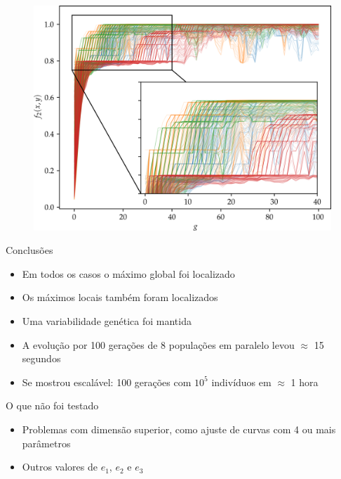 \begin{frame}
  \begin{figure}
    \centering
    \includegraphics[height=0.95\textheight]{imagens/high_prob/evolution_near_gaussians.png}
  \end{figure}
\end{frame}

\begin{frame}
  \begin{block}{Conclusões}
    \begin{itemize}
      \item Em todos os casos o máximo global foi localizado
      \item Os máximos locais também foram localizados
      \item Uma variabilidade genética foi mantida
      \item A evolução por 100 gerações de 8 populações em paralelo
            levou $\approx$ 15 segundos
      \item Se mostrou escalável: 100 gerações com $10^5$ indivíduos
            em $\approx$ 1 hora
    \end{itemize}
  \end{block}
  \begin{alertblock}{O que não foi testado}
    \begin{itemize}
      \item Problemas com dimensão superior, como ajuste de curvas
            com 4 ou mais parâmetros
      \item Outros valores de $e_1$, $e_2$ e $e_3$
    \end{itemize}
  \end{alertblock}
\end{frame}



